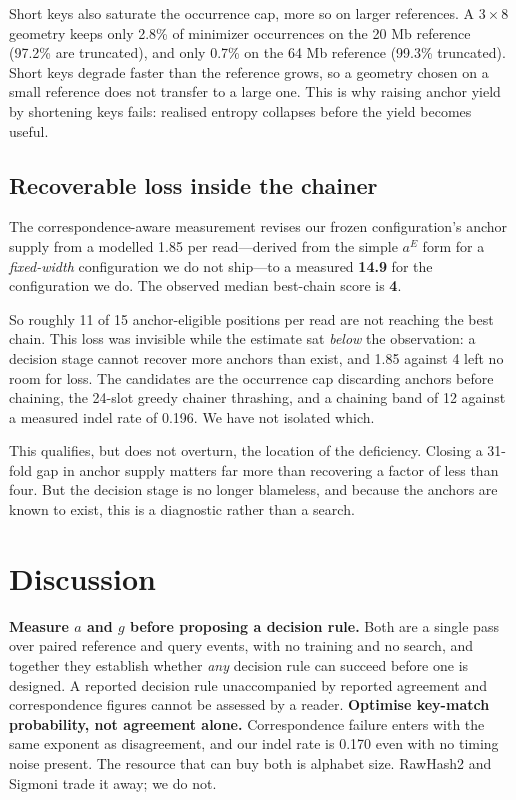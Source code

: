 \documentclass[conference]{IEEEtran}
\begin{document}
Short keys also saturate the occurrence cap, more so on larger references. A $3 \times 8$
geometry keeps only 2.8\% of minimizer occurrences on the 20 Mb reference (97.2\% are
truncated), and only 0.7\% on the 64 Mb reference (99.3\% truncated). Short keys degrade faster than the reference grows, so a
geometry chosen on a small reference does not transfer to a large one. This is why raising
anchor yield by shortening keys fails: realised entropy collapses before the yield becomes
useful.

\subsection{Recoverable loss inside the chainer}

The correspondence-aware measurement revises our frozen configuration's anchor supply from a
modelled 1.85 per read---derived from the simple $a^{E}$ form for a \emph{fixed-width}
configuration we do not ship---to a measured \textbf{14.9} for the configuration we do. The
observed median best-chain score is \textbf{4}.

So roughly 11 of 15 anchor-eligible positions per read are not reaching the best chain. This loss
was invisible while the estimate sat \emph{below} the observation: a decision stage cannot
recover more anchors than exist, and 1.85 against 4 left no room for loss. The candidates are the
occurrence cap discarding anchors before chaining, the 24-slot greedy chainer thrashing, and a
chaining band of 12 against a measured indel rate of 0.196. We have not isolated which.

This qualifies, but does not overturn, the location of the deficiency. Closing a 31-fold gap in
anchor supply matters far more than recovering a factor of less than four. But the decision stage is no longer blameless,
and because the anchors are known to exist, this is a diagnostic rather than a search.

\section{Discussion}
\textbf{Measure $a$ and $g$ before proposing a decision rule.} Both are a single pass over
paired reference and query events, with no training and no search, and together they
establish whether \emph{any} decision rule can succeed before one is designed. A reported
decision rule unaccompanied by reported agreement and correspondence figures cannot be
assessed by a reader. \textbf{Optimise key-match probability, not agreement alone.}
Correspondence failure enters with the same exponent as disagreement, and our indel rate is
0.170 even with no timing noise present. The resource that can buy both is alphabet size.
RawHash2 and Sigmoni trade it away; we do not.
\end{document}
